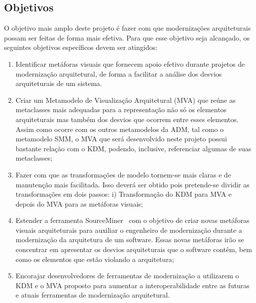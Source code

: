 \documentclass[12pt]{article}
\begin{document}
\subsection{Objetivos}

O objetivo mais amplo deste projeto é fazer com que modernizações arquiteturais possam ser feitas de forma mais efetiva. Para que esse objetivo seja alcançado, os seguintes objetivos específicos devem ser atingidos:

\begin{enumerate}
\item Identificar metáforas visuais que fornecem apoio efetivo durante projetos de modernização arquitetural, de forma a facilitar a análise dos desvios arquiteturais de um sistema.

\item Criar um Metamodelo de Visualização Arquitetural (MVA) que reúne as metaclasses mais adequadas para a representação não só os elementos arquiteturais mas também dos desvios que ocorrem entre esses elementos. Assim como ocorre com os outros metamodelos da ADM, tal como o metamodelo SMM, o MVA que será desenvolvido neste projeto possui bastante relação com o KDM, podendo, inclusive, referenciar algumas de suas metaclasses;

\item Fazer com que as transformações de modelo tornem-se mais claras e de manutenção mais facilitada. Isso deverá ser obtido pois pretende-se dividir as transformações em dois passos: i) Transformação do KDM para MVA e depois do MVA para as metáforas visuais;

\item Estender a ferramenta SourceMiner~\cite{source_miner_glauco} com o objetivo de criar novas metáforas visuais arquiteturais para auxiliar o engenheiro de modernização durante a modernização da arquitetura de um software. Essas novas metáforas irão se concentrar em apresentar os desvios arquiteturais que o software contêm, bem como os elementos que estão violando a arquitetura; 

\item Encorajar desenvolvedores de ferramentas de modernização a utilizarem o KDM e o MVA proposto para aumentar a interoperabilidade entre as futuras e atuais ferramentas de modernização arquitetural.

\end{enumerate}


\end{document}
